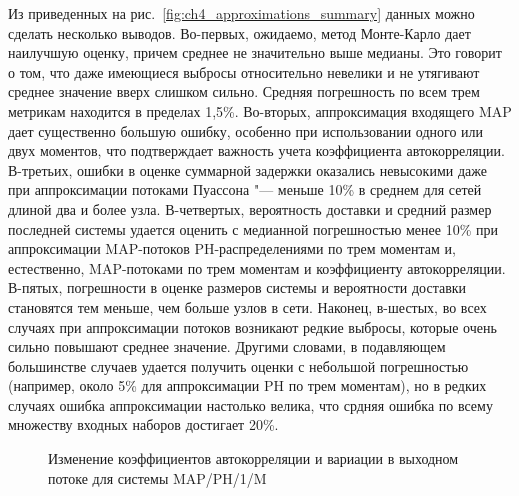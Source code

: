 Из приведенных на рис.~\ref{fig:ch4_approximations_summary} данных можно сделать несколько выводов. Во-первых, ожидаемо, метод Монте-Карло дает наилучшую оценку, причем среднее не значительно выше медианы. Это говорит о том, что даже имеющиеся выбросы относительно невелики и не утягивают среднее значение вверх слишком сильно. Средняя погрешность по всем трем метрикам находится в пределах 1,5\%. Во-вторых, аппроксимация входящего MAP дает существенно большую ошибку, особенно при использовании одного или двух моментов, что подтверждает важность учета коэффициента автокорреляции. В-третьих, ошибки в оценке суммарной задержки оказались невысокими даже при аппроксимации потоками Пуассона "--- меньше 10\% в среднем для сетей длиной два и более узла. В-четвертых, вероятность доставки и средний размер последней системы удается оценить с медианной погрешностью менее 10\% при аппроксимации MAP-потоков PH-распределениями по трем моментам и, естественно, MAP-потоками по трем моментам и коэффициенту автокорреляции. В-пятых, погрешности в оценке размеров системы и вероятности доставки становятся тем меньше, чем больше узлов в сети. Наконец, в-шестых, во всех случаях при аппроксимации потоков возникают редкие выбросы, которые очень сильно повышают среднее значение. Другими словами, в подавляющем большинстве случаев удается получить оценки с небольшой погрешностью (например, около 5\% для аппроксимации PH по трем моментам), но в редких случаях ошибка аппроксимации настолько велика, что срдняя ошибка по всему множеству входных наборов достигает 20\%.

\begin{figure}[h]
  \caption{Изменение коэффициентов автокорреляции и вариации в выходном потоке для системы MAP/PH/1/M}
  \label{fig:ch4_departure_autocorr}
\end{figure}

